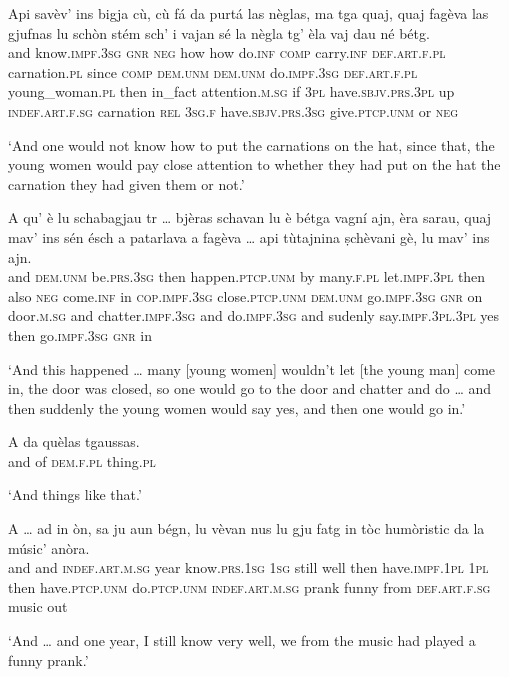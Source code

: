 \begin{linenumbers}
	\gll    Api savèv’ ins bigja cù, cù fá da purtá las nèglas, ma tga quaj, quaj fagèva las gjufnas lu schòn stém sch’ i vajan sé la nègla tg’ èla vaj dau né bétg.\\
	and know.\textsc{impf.3sg} \textsc{gnr} \textsc{neg} how how do.\textsc{inf} \textsc{comp} carry.\textsc{inf} \textsc{def.art.f.pl} carnation.\textsc{pl} since \textsc{comp} \textsc{dem.unm} \textsc{dem.unm} do.\textsc{impf.3sg} \textsc{def.art.f.pl} young\_woman.\textsc{pl} then in\_fact attention.\textsc{m.sg} if \textsc{3pl}  have.\textsc{sbjv.prs.3pl} up \textsc{indef.art.f.sg} carnation \textsc{rel} \textsc{3sg.f} have.\textsc{sbjv.prs.3sg}  give.\textsc{ptcp.unm} or \textsc{neg} \\
\end{linenumbers}
\medskip
\glt `And one would not know how to put the carnations on the hat, since that, the young women would pay close attention to whether they had put on the hat the carnation they had given them or not.'
\medskip

\begin{linenumbers}
	\gll    A qu’ è lu schabagjau tr … bjèras schavan lu è bétga vagní ajn, èra sarau, quaj mav’ ins sén ésch a patarlava a fagèva … api tùtajnina ṣchèvani gè, lu mav’ ins ajn.\\
	and \textsc{dem.unm} be.\textsc{prs.3sg} then happen.\textsc{ptcp.unm} by {} many.\textsc{f.pl}  let.\textsc{impf.3pl} then also \textsc{neg} come.\textsc{inf} in  \textsc{cop.impf.3sg} close.\textsc{ptcp.unm} \textsc{dem.unm} go.\textsc{impf.3sg} \textsc{gnr} on  door.\textsc{m.sg} and chatter.\textsc{impf.3sg} and do.\textsc{impf.3sg} {} and sudenly say.\textsc{impf.3pl.3pl} yes then  go.\textsc{impf.3sg} \textsc{gnr} in\\
\end{linenumbers}
\medskip
\glt `And this happened … many [young women] wouldn’t let [the young man] come in, the door was closed, so one would go to the door and chatter  and do … and then suddenly the young women would say yes, and then one would go in.'
\medskip

\begin{linenumbers}
	\gll    A da quèlas tgaussas.\\
	and of \textsc{dem.f.pl} thing.\textsc{pl}\\
\end{linenumbers}
\medskip
\glt `And things like that.'
\medskip

\begin{linenumbers}
	\gll    A … ad in òn, sa ju aun bégn, lu vèvan nus lu gju fatg in tòc humòristic  da la músic’ anòra.\\
	and {} and  \textsc{indef.art.m.sg} year know.\textsc{prs.1sg} \textsc{1sg} still well then have.\textsc{impf.1pl} \textsc{1pl} then have.\textsc{ptcp.unm} do.\textsc{ptcp.unm} \textsc{indef.art.m.sg} prank funny from \textsc{def.art.f.sg} music out\\
\end{linenumbers}
\medskip
\glt `And … and one year, I still know very well, we from the music had played a funny prank.'
\medskip

